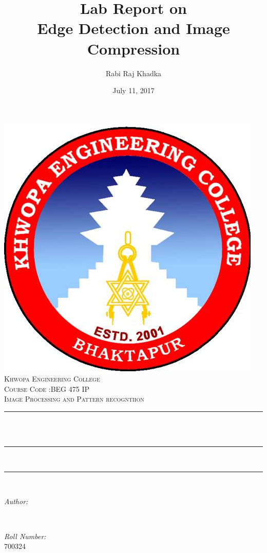 \documentclass[12pt]{article}
\title{Lab Report on \\Edge Detection and Image Compression }								%
\author{Rabi Raj Khadka}								%
\date{July 11, 2017}											%
\makeatletter
\let\thetitle\@title
\let\theauthor\@author
\let\thedate\@date
\makeatother
\begin{document}
\begin{titlepage}
	\centering
    \includegraphics[scale = 0.3]{kheclogo.jpg}\\[1.0 cm]	%
    \textsc{\LARGE Khwopa Engineering College}\\[1.5 cm]	%
	\textsc{\Large Course Code :BEG 475 IP}\\[0.5 cm]				%
	\textsc{\large Image Processing and Pattern recogntiion}\\[0.5 cm]				%
	\rule{\linewidth}{0.2 mm} \\[0.4 cm]
	{ \huge \bfseries \thetitle}\\
	\rule{\linewidth}{0.2 mm} \\[1.0 cm]
	
	
	\rule{\linewidth}{0 mm} \\[1.0 cm]

	\begin{minipage}{0.4\textwidth}
		\begin{flushleft} \large
			\emph{Author:}\\
			\theauthor
			\end{flushleft}
			\end{minipage}~
			\begin{minipage}{0.4\textwidth}
			\begin{flushright} \large
			\emph{Roll  Number:} \\
			700324									%
		\end{flushright}
	\end{minipage}\\[2cm]
	
	{\large \thedate}\\[2 cm]
 
	\vfill
	
\end{titlepage}
\tableofcontents
\pagebreak
\end{document}
